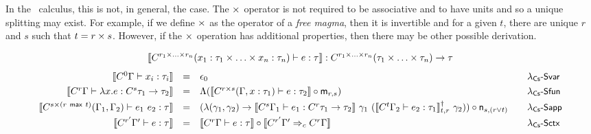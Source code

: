 In the \clstr~calculus, this is not, in general, the case. The $\times$ operator is not required 
to be associative and to have units and so a unique splitting may exist.  For example, if we
define $\times$ as the operator of a \emph{free magma}, then it is invertible and for a given
$t$, there are unique $r$ and $s$ such that $t = r \times s$. However, if the $\times$ operation 
has additional properties, then there may be other possible derivation.



\begin{figure*}[t]
\newcommand{\uu}[1]{\overline{#1}}
\begin{equation*}
\llbracket C^{r_1 \times \ldots \times r_n}(x_1 : \tau_1 \times \ldots \times x_n : \tau_n) \vdash e : \tau \rrbracket : 
  C^{r_1 \times \ldots \times r_n}(\tau_1 \times \ldots \times \tau_n) \rightarrow \tau
\end{equation*}
\begin{equation*}
\begin{array}{rcll}
\cosem{\ctyp{0}{\Gamma} \vdash x_i : \tau_i} &=&
    \epsilon_0                                                                   &\quad$\ruless{var}$
\\[0.32em]
\cosem{\ctyp{r}{\Gamma} \vdash \lambda x.e : \ctyp{s}{\tau_1} \rightarrow \tau_2} &=& 
    \Lambda (\cosem{\ctyp{r \cprd s}{(\Gamma, x:\tau_1)} \vdash e : \tau_2} \circ \cmerge_{r, s})    &\quad$\ruless{fun}$
\\[0.32em]
\cosem{\ctyp{s \cprd (r \cvop t)}{(\Gamma_1, \Gamma_2)} \vdash e_1~e_2 : \tau} &=& 
    (\lambda (\gamma_1, \gamma_2) \rightarrow
    \cosem{\ctyp{s}{\Gamma_1} \vdash e_1 : \ctyp{r}{\tau_1} \rightarrow \tau_2}~\gamma_1~
    (\cobind{\cosem{\ctyp{t}{\Gamma_2}\vdash e_2 : \tau_1}}{t,r}~\gamma_2)) \circ \csplit_{s,(r \vee t)}  &\quad$\ruless{app}$
\\[0.32em]
\cosem{\ctyp{r'}{\Gamma'} \vdash e : \tau} &=&
    \cosem{\ctyp{r}{\Gamma} \vdash e : \tau} \circ \cosem{\ctxtrans{\ctyp{r'}{\Gamma'}}{\ctyp{r}{\Gamma}}}       &\quad$\ruless{ctx}$
\end{array}
\end{equation*}


\end{figure*}
